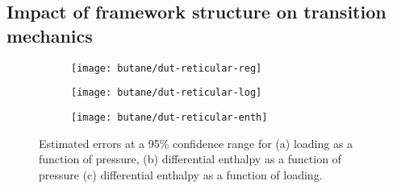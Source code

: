 
\subsection{Impact of framework structure on transition mechanics}%
\label{dut:comparison}


\begin{figure}[htb]
    \centering
    \begin{subfigure}{0.33\linewidth}
        \texttt{[image: butane/dut-reticular-reg]}%
        \caption{}\label{dut:fgr:dut-reticular-reg}
    \end{subfigure}%
    \begin{subfigure}{0.33\linewidth}
        \texttt{[image: butane/dut-reticular-log]}%
        \caption{}\label{dut:fgr:dut-reticular-log}
    \end{subfigure}%
    \begin{subfigure}{0.33\linewidth}
        \texttt{[image: butane/dut-reticular-enth]}%
        \caption{}\label{dut:fgr:dut-reticular-enth}
    \end{subfigure}%
    \caption{Estimated errors at a 95\% confidence range for 
    (a) loading as a function of pressure, 
    (b) differential enthalpy as a function of pressure 
    (c) differential enthalpy as a function of loading.}%
    \label{dut:fgr:dut-reticular}
\end{figure}